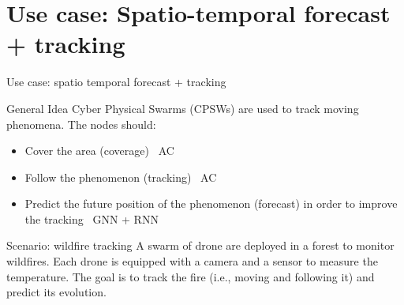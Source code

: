 \documentclass[presentation, 9pt]{beamer}\mode<presentation>{\usetheme{AMSBolognaFC}}
\begin{document}
\section{Use case: Spatio-temporal forecast + tracking}
\begin{frame}{Use case: spatio temporal forecast + tracking}
\begin{alertblock}{General Idea}
	Cyber Physical Swarms (CPSWs) are used to track moving phenomena. The nodes should:
	\begin{itemize}
		\item Cover the area (coverage) \faArrowRight \, AC
		\item Follow the phenomenon (tracking) \faArrowRight \, AC
		\item Predict the future position of the phenomenon (forecast) in order to improve the tracking \faArrowRight \, GNN + RNN
	\end{itemize}
\end{alertblock}
\begin{alertblock}{Scenario: wildfire tracking}
	A swarm of drone are deployed in a forest to monitor wildfires. 
	Each drone is equipped with a camera and a sensor to measure the temperature. 
	The goal is to track the fire (i.e., moving and following it) and predict its evolution.
\end{alertblock}
\end{frame}
\end{document}
